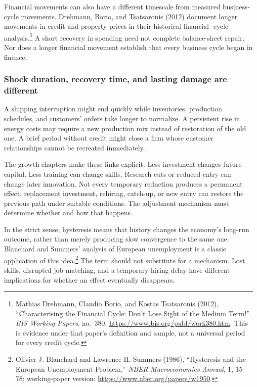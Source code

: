 Financial movements can also have a different timescale from measured
business-cycle movements. Drehmann, Borio, and Tsatsaronis (2012) document
longer movements in credit and property prices in their historical financial-
cycle analysis.\footnote{Mathias Drehmann, Claudio Borio, and Kostas
Tsatsaronis (2012), ``Characterising the Financial Cycle: Don't Lose Sight
of the Medium Term!'' \textit{BIS Working Papers}, no.~380.
\url{https://www.bis.org/publ/work380.htm}. This is evidence under that
paper's definition and sample, not a universal period for every credit cycle.}
A short recovery in spending need not complete balance-sheet repair. Nor
does a longer financial movement establish that every business cycle began
in finance.

\subsubsection{Shock duration, recovery time, and lasting damage are different}

A shipping interruption might end quickly while inventories, production
schedules, and customers' orders take longer to normalize. A persistent
rise in energy costs may require a new production mix instead of restoration
of the old one. A brief period without credit might close a firm whose
customer relationships cannot be recreated immediately.

The growth chapters make these links explicit. Less investment changes
future capital. Less training can change skills. Research cuts or reduced
entry can change later innovation. Not every temporary reduction produces
a permanent effect: replacement investment, rehiring, catch-up, or new entry
can restore the previous path under suitable conditions. The adjustment
mechanism must determine whether and how that happens.

In the strict sense, hysteresis means that history changes the economy's
long-run outcome, rather than merely producing slow convergence to the same
one. Blanchard and Summers' analysis of European unemployment is a classic
application of this idea.\footnote{Olivier J. Blanchard and Lawrence H.
Summers (1986), ``Hysteresis and the European Unemployment Problem,''
\textit{NBER Macroeconomics Annual}, 1, 15--78; working-paper version:
\url{https://www.nber.org/papers/w1950}.}
The term should not substitute for a mechanism. Lost skills, disrupted job
matching, and a temporary hiring delay have different implications for
whether an effect eventually disappears.

